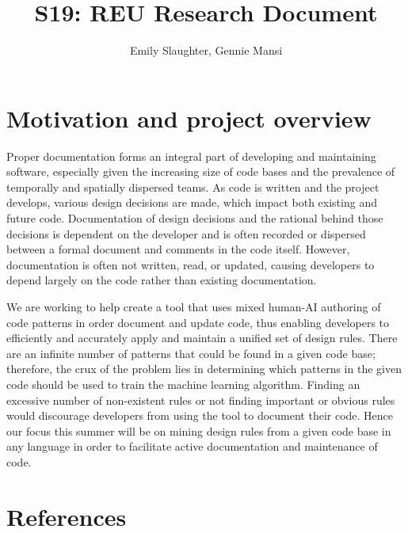 \documentclass[12pt]{article}
\title{S19: REU Research Document}
\author{Emily Slaughter, Gennie Mansi }
\begin{document}
\maketitle

\clearpage

\tableofcontents

\clearpage

\section{Motivation and project overview}

Proper documentation forms an integral part of developing and maintaining software, especially given the increasing size of code bases and the prevalence of temporally and spatially dispersed teams. As code is written and the project develops, various design decisions are made, which impact both existing and future code. Documentation of design decisions and the rational behind those decisions is dependent on the developer and is often recorded or dispersed between a formal document and comments in the code itself. However, documentation is often not written, read, or updated, causing developers to depend largely on the code rather than existing documentation. 

We are working to help create a tool that uses mixed human-AI authoring of code patterns in order document and update code, thus enabling developers to efficiently and accurately apply and maintain a unified set of design rules. There are an infinite number of patterns that could be found in a given code base; therefore, the crux of the problem lies in determining which patterns in the given code should be used to train the machine learning algorithm. Finding an excessive number of non-existent rules or not finding important or obvious rules would discourage developers from using the tool to document their code. Hence our focus this summer will be on mining design rules from a given code base in any language in order to facilitate active documentation and maintenance of code.

\clearpage


\section{References}

\printbibliography
\end{document}
